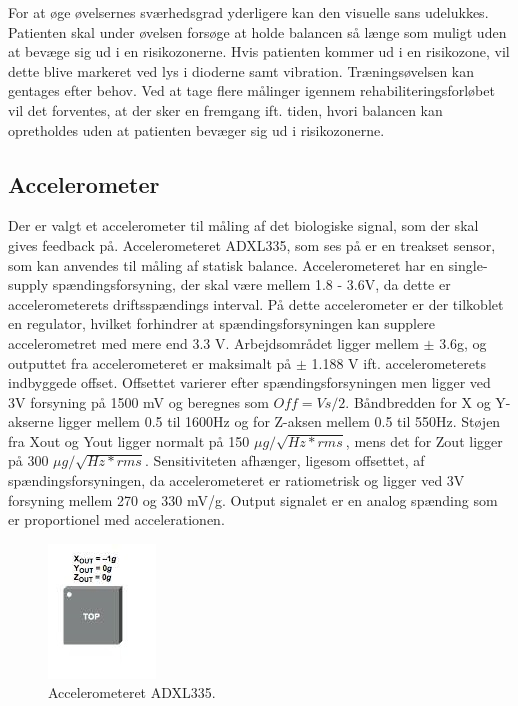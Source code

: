 For at øge øvelsernes sværhedsgrad yderligere kan den visuelle sans udelukkes. Patienten skal under øvelsen forsøge at holde balancen så længe som muligt uden at bevæge sig ud i en risikozonerne. Hvis patienten kommer ud i en risikozone, vil dette blive markeret ved lys i dioderne samt vibration. Træningsøvelsen kan gentages efter behov. Ved at tage flere målinger igennem rehabiliteringsforløbet vil det forventes, at der sker en fremgang ift. tiden, hvori balancen kan opretholdes uden at patienten bevæger sig ud i risikozonerne. 

\subsection{Accelerometer}
Der er valgt et accelerometer til måling af det biologiske signal, som der skal gives feedback på. Accelerometeret ADXL335, som ses på  er en treakset sensor, som kan anvendes til måling af statisk balance. Accelerometeret har en single-supply spændingsforsyning, der skal være mellem 1.8 - 3.6V, da dette er accelerometerets driftsspændings interval. På dette accelerometer er der tilkoblet en regulator, hvilket forhindrer at spændingsforsyningen kan supplere accelerometret med mere end 3.3 V.  Arbejdsområdet ligger mellem $\pm$ 3.6g, og outputtet fra accelerometeret er maksimalt på $\pm$ 1.188 V ift. accelerometerets indbyggede offset. Offsettet varierer efter spændingsforsyningen men ligger ved 3V forsyning på 1500 mV og beregnes som $Off = Vs/2$. Båndbredden for X og Y-akserne ligger mellem 0.5 til 1600Hz og for Z-aksen mellem 0.5 til 550Hz. Støjen fra Xout og Yout ligger normalt på 150 $\mu g/\sqrt{Hz * rms}$, mens det for Zout ligger på 300 $\mu g/\sqrt{Hz * rms}$. Sensitiviteten afhænger, ligesom offsettet, af spændingsforsyningen, da accelerometeret er ratiometrisk og ligger ved 3V forsyning mellem 270 og 330 mV/g. Output signalet er en analog spænding som er proportionel med accelerationen. \cite{Devices2009} %

\begin{figure}[H]
	\centering 
	\includegraphics[scale=0.9]{figures/cProblemloesning/ADXL335.JPG}
	\caption{Accelerometeret ADXL335. \cite{Devices2009}}
	\label{ADXL335}
\end{figure}

